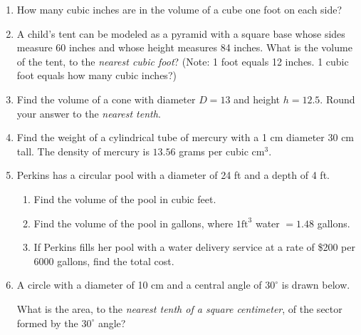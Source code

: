\documentclass[12pt, twoside]{article}
\begin{document}
 \begin{enumerate}

  \item How many cubic inches are in the volume of a cube one foot on each side?  \vspace{3.0cm}

  \item A child’s tent can be modeled as a pyramid with a square base whose sides measure 60 inches and whose height measures 84 inches. What is the volume of the tent, to the \emph{nearest cubic foot}? (Note: 1 foot equals 12 inches. 1 cubic foot equals how many cubic inches?) \vspace{4.0cm}

  \item Find the volume of a cone with diameter $D=13$ and height $h=12.5$. Round your answer to the \emph{nearest tenth}. \vspace{4.5cm}

  \item Find the weight of a cylindrical tube of mercury with a 1 cm diameter 30 cm tall.  The density of mercury is $13.56$ grams per cubic $\mathrm{cm}^3$. \vspace{3.0cm}

\newpage
  \item Perkins has a circular pool with a diameter of 24 ft and a depth of 4 ft.
    \begin{enumerate}
      \item Find the volume of the pool in cubic feet. \vspace{2.5cm}
      \item Find the volume of the pool in gallons, where $1 \mathrm{ ft}^3$ water $= 1.48$ gallons. \vspace{2.5cm}
      \item If Perkins fills her pool with a water delivery service at a rate of \$200 per 6000 gallons, find the total cost.
    \end{enumerate} \vspace{2.5cm}

  \item A circle with a diameter of 10 cm and a central angle of $30^\circ$ is drawn below.
       \begin{center}
     \end{center}
  What is the area, to the \emph{nearest tenth of a square centimeter}, of the sector formed by the $30^\circ$ angle?


\end{enumerate}
\end{document}
